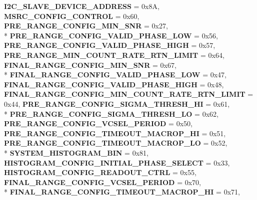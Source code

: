 \begin{DoxyCompactItemize}
{\bfseries I2\+C\+\_\+\+S\+L\+A\+V\+E\+\_\+\+D\+E\+V\+I\+C\+E\+\_\+\+A\+D\+D\+R\+E\+SS} = 0x8A, 
{\bfseries M\+S\+R\+C\+\_\+\+C\+O\+N\+F\+I\+G\+\_\+\+C\+O\+N\+T\+R\+OL} = 0x60, 
{\bfseries P\+R\+E\+\_\+\+R\+A\+N\+G\+E\+\_\+\+C\+O\+N\+F\+I\+G\+\_\+\+M\+I\+N\+\_\+\+S\+NR} = 0x27, 
\\*
{\bfseries P\+R\+E\+\_\+\+R\+A\+N\+G\+E\+\_\+\+C\+O\+N\+F\+I\+G\+\_\+\+V\+A\+L\+I\+D\+\_\+\+P\+H\+A\+S\+E\+\_\+\+L\+OW} = 0x56, 
{\bfseries P\+R\+E\+\_\+\+R\+A\+N\+G\+E\+\_\+\+C\+O\+N\+F\+I\+G\+\_\+\+V\+A\+L\+I\+D\+\_\+\+P\+H\+A\+S\+E\+\_\+\+H\+I\+GH} = 0x57, 
{\bfseries P\+R\+E\+\_\+\+R\+A\+N\+G\+E\+\_\+\+M\+I\+N\+\_\+\+C\+O\+U\+N\+T\+\_\+\+R\+A\+T\+E\+\_\+\+R\+T\+N\+\_\+\+L\+I\+M\+IT} = 0x64, 
{\bfseries F\+I\+N\+A\+L\+\_\+\+R\+A\+N\+G\+E\+\_\+\+C\+O\+N\+F\+I\+G\+\_\+\+M\+I\+N\+\_\+\+S\+NR} = 0x67, 
\\*
{\bfseries F\+I\+N\+A\+L\+\_\+\+R\+A\+N\+G\+E\+\_\+\+C\+O\+N\+F\+I\+G\+\_\+\+V\+A\+L\+I\+D\+\_\+\+P\+H\+A\+S\+E\+\_\+\+L\+OW} = 0x47, 
{\bfseries F\+I\+N\+A\+L\+\_\+\+R\+A\+N\+G\+E\+\_\+\+C\+O\+N\+F\+I\+G\+\_\+\+V\+A\+L\+I\+D\+\_\+\+P\+H\+A\+S\+E\+\_\+\+H\+I\+GH} = 0x48, 
{\bfseries F\+I\+N\+A\+L\+\_\+\+R\+A\+N\+G\+E\+\_\+\+C\+O\+N\+F\+I\+G\+\_\+\+M\+I\+N\+\_\+\+C\+O\+U\+N\+T\+\_\+\+R\+A\+T\+E\+\_\+\+R\+T\+N\+\_\+\+L\+I\+M\+IT} = 0x44, 
{\bfseries P\+R\+E\+\_\+\+R\+A\+N\+G\+E\+\_\+\+C\+O\+N\+F\+I\+G\+\_\+\+S\+I\+G\+M\+A\+\_\+\+T\+H\+R\+E\+S\+H\+\_\+\+HI} = 0x61, 
\\*
{\bfseries P\+R\+E\+\_\+\+R\+A\+N\+G\+E\+\_\+\+C\+O\+N\+F\+I\+G\+\_\+\+S\+I\+G\+M\+A\+\_\+\+T\+H\+R\+E\+S\+H\+\_\+\+LO} = 0x62, 
{\bfseries P\+R\+E\+\_\+\+R\+A\+N\+G\+E\+\_\+\+C\+O\+N\+F\+I\+G\+\_\+\+V\+C\+S\+E\+L\+\_\+\+P\+E\+R\+I\+OD} = 0x50, 
{\bfseries P\+R\+E\+\_\+\+R\+A\+N\+G\+E\+\_\+\+C\+O\+N\+F\+I\+G\+\_\+\+T\+I\+M\+E\+O\+U\+T\+\_\+\+M\+A\+C\+R\+O\+P\+\_\+\+HI} = 0x51, 
{\bfseries P\+R\+E\+\_\+\+R\+A\+N\+G\+E\+\_\+\+C\+O\+N\+F\+I\+G\+\_\+\+T\+I\+M\+E\+O\+U\+T\+\_\+\+M\+A\+C\+R\+O\+P\+\_\+\+LO} = 0x52, 
\\*
{\bfseries S\+Y\+S\+T\+E\+M\+\_\+\+H\+I\+S\+T\+O\+G\+R\+A\+M\+\_\+\+B\+IN} = 0x81, 
{\bfseries H\+I\+S\+T\+O\+G\+R\+A\+M\+\_\+\+C\+O\+N\+F\+I\+G\+\_\+\+I\+N\+I\+T\+I\+A\+L\+\_\+\+P\+H\+A\+S\+E\+\_\+\+S\+E\+L\+E\+CT} = 0x33, 
{\bfseries H\+I\+S\+T\+O\+G\+R\+A\+M\+\_\+\+C\+O\+N\+F\+I\+G\+\_\+\+R\+E\+A\+D\+O\+U\+T\+\_\+\+C\+T\+RL} = 0x55, 
{\bfseries F\+I\+N\+A\+L\+\_\+\+R\+A\+N\+G\+E\+\_\+\+C\+O\+N\+F\+I\+G\+\_\+\+V\+C\+S\+E\+L\+\_\+\+P\+E\+R\+I\+OD} = 0x70, 
\\*
{\bfseries F\+I\+N\+A\+L\+\_\+\+R\+A\+N\+G\+E\+\_\+\+C\+O\+N\+F\+I\+G\+\_\+\+T\+I\+M\+E\+O\+U\+T\+\_\+\+M\+A\+C\+R\+O\+P\+\_\+\+HI} = 0x71, 

\end{DoxyCompactItemize}
